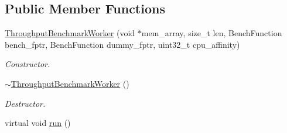 \subsection*{Public Member Functions}
\begin{DoxyCompactItemize}
\item 
\hyperlink{classxmem_1_1benchmark_1_1_throughput_benchmark_worker_a271c77940bc7cb45fcc395d3ed14361c}{Throughput\+Benchmark\+Worker} (void $\ast$mem\+\_\+array, size\+\_\+t len, Bench\+Function bench\+\_\+fptr, Bench\+Function dummy\+\_\+fptr, uint32\+\_\+t cpu\+\_\+affinity)
\begin{DoxyCompactList}\small\item\em Constructor. \end{DoxyCompactList}\item 
\hypertarget{classxmem_1_1benchmark_1_1_throughput_benchmark_worker_a021aae8513f5da78e04ba711e308b705}{}\hyperlink{classxmem_1_1benchmark_1_1_throughput_benchmark_worker_a021aae8513f5da78e04ba711e308b705}{$\sim$\+Throughput\+Benchmark\+Worker} ()\label{classxmem_1_1benchmark_1_1_throughput_benchmark_worker_a021aae8513f5da78e04ba711e308b705}

\begin{DoxyCompactList}\small\item\em Destructor. \end{DoxyCompactList}\item 
\hypertarget{classxmem_1_1benchmark_1_1_throughput_benchmark_worker_afb71dd763f55504ddabcabb24e0d6834}{}virtual void \hyperlink{classxmem_1_1benchmark_1_1_throughput_benchmark_worker_afb71dd763f55504ddabcabb24e0d6834}{run} ()\label{classxmem_1_1benchmark_1_1_throughput_benchmark_worker_afb71dd763f55504ddabcabb24e0d6834}


\end{DoxyCompactItemize}
